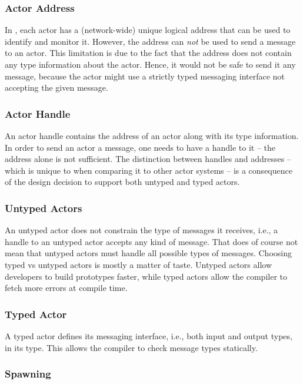 \subsubsection{Actor Address}

In \libcppa, each actor has a (network-wide) unique logical address that can be used to identify and monitor it.
However, the address can \emph{not} be used to send a message to an actor.
This limitation is due to the fact that the address does not contain any type information about the actor.
Hence, it would not be safe to send it any message, because the actor might use a strictly typed messaging interface not accepting the given message.

\subsubsection{Actor Handle}

An actor handle contains the address of an actor along with its type information.
In order to send an actor a message, one needs to have a handle to it -- the address alone is not sufficient.
The distinction between handles and addresses -- which is unique to \libcppa when comparing it to other actor systems -- is a consequence of the design decision to support both untyped and typed actors.

\subsubsection{Untyped Actors}

An untyped actor does not constrain the type of messages it receives, i.e., a handle to an untyped actor accepts any kind of message.
That does of course not mean that untyped actors must handle all possible types of messages.
Choosing typed vs untyped actors is mostly a matter of taste.
Untyped actors allow developers to build prototypes faster, while typed actors allow the compiler to fetch more errors at compile time.

\subsubsection{Typed Actor}

A typed actor defines its messaging interface, i.e., both input and output types, in its type.
This allows the compiler to check message types statically.

\subsubsection{Spawning}

